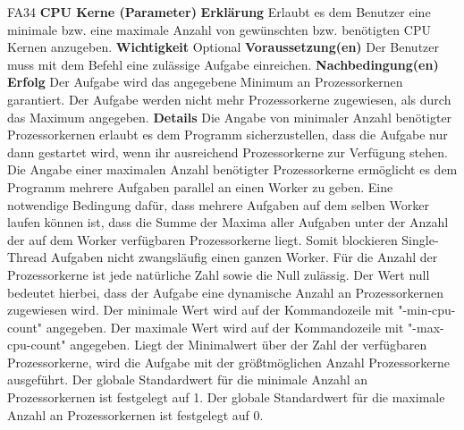 \documentclass[a4paper,12pt]{article}
\begin{document}
\begin{itemize}[nosep]
\begin{minipage}[t]{\linewidth}
\item[FA34] \textbf{CPU Kerne (Parameter)}
\subitem \textbf{Erklärung} Erlaubt es dem \gls{Benutzer} eine minimale bzw. eine maximale Anzahl von gewünschten bzw. benötigten CPU Kernen anzugeben.
\subitem \textbf{Wichtigkeit} Optional
\subitem \textbf{Voraussetzung(en)} Der Benutzer muss mit dem Befehl eine zulässige Aufgabe einreichen.
\subitem \textbf{Nachbedingung(en)}
\subsubitem \textbf{Erfolg} Der Aufgabe wird das angegebene Minimum an Prozessorkernen garantiert.\newline
Der Aufgabe werden nicht mehr Prozessorkerne zugewiesen, als durch das Maximum angegeben.\newline
\subitem \textbf{Details} Die Angabe von minimaler Anzahl benötigter Prozessorkernen erlaubt es dem Programm sicherzustellen, dass die Aufgabe nur dann gestartet wird, wenn ihr ausreichend Prozessorkerne zur Verfügung stehen.\newline
Die Angabe einer maximalen Anzahl benötigter Prozessorkerne ermöglicht es dem Programm mehrere Aufgaben parallel an einen \gls{Worker} zu geben. Eine notwendige Bedingung dafür, dass mehrere Aufgaben auf dem selben \gls{Worker} laufen können ist, dass die Summe der Maxima aller Aufgaben unter der Anzahl der auf dem \gls{Worker} verfügbaren Prozessorkerne liegt. Somit blockieren Single-Thread Aufgaben nicht zwangsläufig einen ganzen \gls{Worker}.\newline
Für die Anzahl der Prozessorkerne ist jede natürliche Zahl sowie die Null zulässig.\newline
Der Wert null bedeutet hierbei, dass der Aufgabe eine dynamische Anzahl an Prozessorkernen zugewiesen wird.\newline
Der minimale Wert wird auf der Kommandozeile mit "-min-cpu-count" angegeben.\newline
Der maximale Wert wird auf der Kommandozeile mit "-max-cpu-count" angegeben.\newline
Liegt der Minimalwert über der Zahl der verfügbaren Prozessorkerne, wird die Aufgabe mit der größtmöglichen Anzahl Prozessorkerne ausgeführt.\newline
Der globale Standardwert für die minimale Anzahl an Prozessorkernen ist festgelegt auf 1.\newline
Der globale Standardwert für die maximale Anzahl an Prozessorkernen ist festgelegt auf 0.
\end{minipage}
\pagebreak


\end{itemize}
\end{document}
